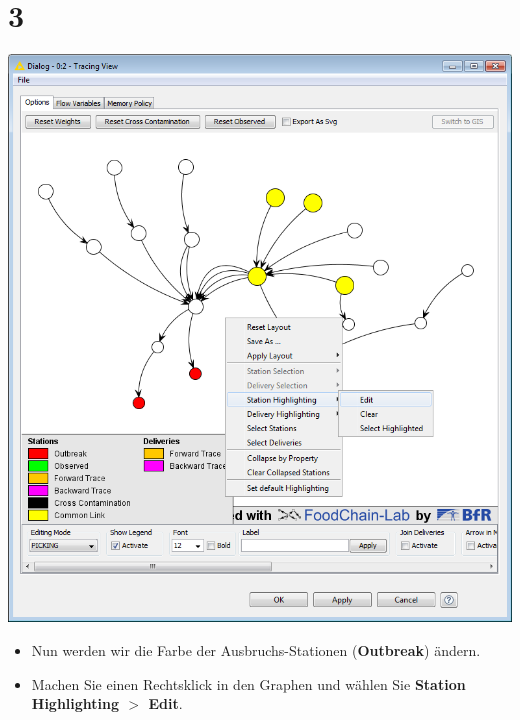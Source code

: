 \documentclass{beamer}
\begin{document}
\section{3}
\begin{frame}
	\begin{center}
  		\includegraphics[height=0.6\textheight]{3.png}
	\end{center}
	\begin{itemize}
		\item Nun werden wir die Farbe der Ausbruchs-Stationen (\textbf{Outbreak}) ändern.
		\item Machen Sie einen Rechtsklick in den Graphen und wählen Sie \textbf{Station Highlighting $>$ Edit}.
	\end{itemize}
\end{frame}
\end{document}
